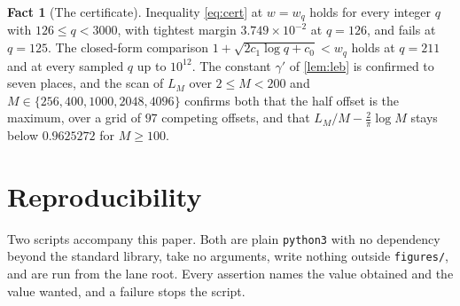 \documentclass[11pt]{amsart}
\theoremstyle{definition}
\newtheorem{fact}[theorem]{Fact}
\theoremstyle{remark}
\begin{document}
\begin{fact}[The certificate]
\label{fact:cert}
Inequality \cref{eq:cert} at $w = w_{q}$ holds for every integer $q$ with $126 \le q < 3000$, with tightest margin $3.749 \times 10^{-2}$ at $q = 126$, and fails at $q = 125$. The closed-form comparison $1 + \sqrt{2c_{1}\log q + c_{0}} < w_{q}$ holds at $q = 211$ and at every sampled $q$ up to $10^{12}$. The constant $\gamma'$ of \cref{lem:leb} is confirmed to seven places, and the scan of $L_{M}$ over $2 \le M < 200$ and $M \in \{256, 400, 1000, 2048, 4096\}$ confirms both that the half offset is the maximum, over a grid of $97$ competing offsets, and that $L_{M}/M - \frac{2}{\pi}\log M$ stays below $0.9625272$ for $M \ge 100$.
\end{fact}

\section{Reproducibility}
\label{sec:repro}

Two scripts accompany this paper. Both are plain \texttt{python3} with no dependency beyond the standard library, take no arguments, write nothing outside \texttt{figures/}, and are run from the lane root. Every assertion names the value obtained and the value wanted, and a failure stops the script.
\end{document}
